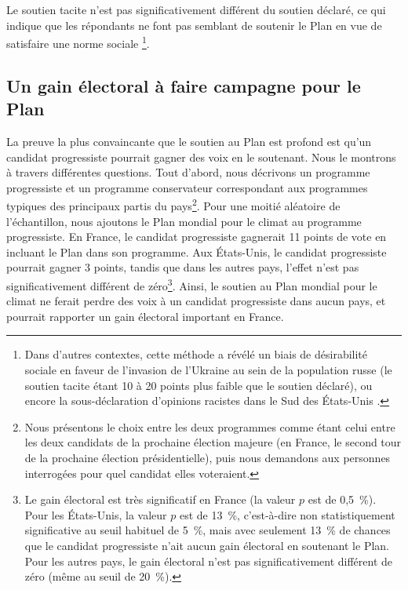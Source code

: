 \documentclass[a5paper,french,openany]{memoir}
\begin{document}
Le soutien tacite n'est pas significativement différent du soutien déclaré, ce qui indique que les répondants ne font pas semblant %
de soutenir le Plan en vue de satisfaire une norme sociale%
\footnote{Dans d'autres contextes, cette méthode a révélé un biais de désirabilité sociale en faveur de l'invasion de l'Ukraine au sein de la population russe (le soutien tacite étant 10 à 20 points plus faible que le soutien déclaré), ou encore la sous-déclaration d'opinions racistes dans le Sud des États-Unis \citep{kuklinski_racial_1997,chapkovski_solid_2022}.}. 

\subsection{Un gain électoral à faire campagne pour le Plan}
La preuve la plus convaincante que le soutien au Plan est profond est qu'un candidat progressiste pourrait gagner des voix en le soutenant. Nous le montrons à travers différentes questions. Tout d'abord, nous décrivons un programme progressiste et un programme conservateur correspondant aux programmes typiques des principaux partis du pays\footnote{Nous présentons le choix entre les deux programmes comme étant celui entre les deux candidats de la prochaine élection majeure (en France, le second tour de la prochaine élection présidentielle), puis nous demandons aux personnes interrogées pour quel candidat elles voteraient.}. Pour une moitié aléatoire de l'échantillon, nous ajoutons le Plan mondial pour le climat au programme progressiste. En France, le candidat progressiste gagnerait 11 points de vote en incluant le Plan dans son programme. Aux États-Unis, le candidat progressiste pourrait gagner 3 points, tandis que dans les autres pays, l'effet n'est pas significativement différent de zéro\footnote{Le gain électoral est très significatif en France (la valeur $p$ est de 0,5~\%). Pour les États-Unis, la valeur $p$ est de 13~\%, c'est-à-dire non statistiquement significative au seuil habituel de 5~\%, mais avec seulement 13~\% de chances que le candidat progressiste n'ait aucun gain électoral en soutenant le Plan. Pour les autres pays, le gain électoral n'est pas significativement différent de zéro (même au seuil de 20~\%).}. 
%
Ainsi, le soutien au Plan mondial pour le climat ne ferait perdre des voix à un candidat progressiste dans aucun pays, et pourrait rapporter un gain électoral important en France. 
\end{document}
